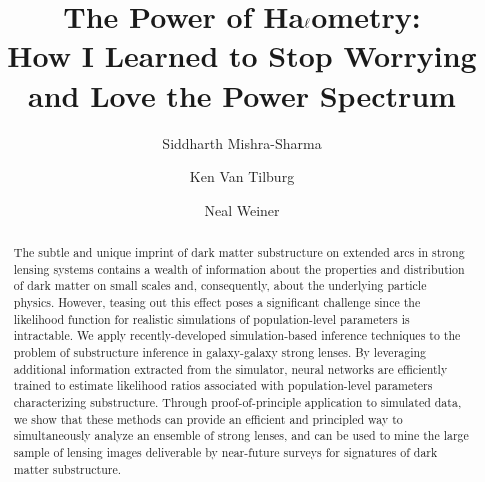 \documentclass[twocolumn]{aastex63}
\begin{document}
\sloppy\sloppypar\raggedbottom\frenchspacing

\title{\textbf{
The Power of Ha$\boldmath\ell$ometry: \\
How I Learned to Stop Worrying and Love the Power Spectrum
}}


\author[0000-0001-9088-7845]{Siddharth Mishra-Sharma}

\author[0000-0002-5769-7094]{Ken Van Tilburg}

\author[0000-0003-2122-6511]{Neal Weiner}


\begin{abstract}\noindent
The subtle and unique imprint of dark matter substructure on extended arcs in strong lensing systems contains a wealth of information about the properties and distribution of dark matter on small scales and, consequently, about the underlying particle physics. However, teasing out this effect poses a significant challenge since the likelihood function for realistic simulations of population-level parameters is intractable. We apply recently-developed simulation-based inference techniques to the problem of substructure inference in galaxy-galaxy strong lenses. By leveraging additional information extracted from the simulator, neural networks are efficiently trained to estimate likelihood ratios associated with population-level parameters characterizing substructure. Through proof-of-principle application to simulated data, we show that these methods can provide an efficient and principled way to simultaneously analyze an ensemble of strong lenses, and can be used to mine the large sample of lensing images deliverable by near-future surveys for signatures of dark matter substructure. \href{https://github.com/smsharma/StrongLensing-Inference}{\faGithub}
\end{abstract}

\end{document}
